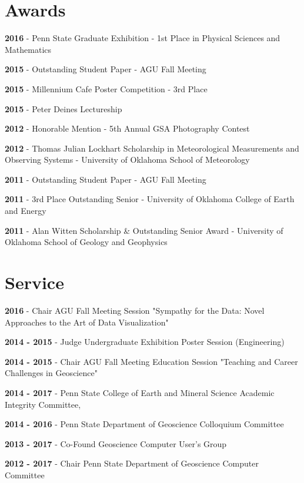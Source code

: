 \documentclass[letterpaper]{article}
\renewenvironment{itemize}{
  \begin{list}{}{
    \setlength{\leftmargin}{1.5em}
  }
}{
  \end{list}
}
\begin{document}
\section*{Awards}
\begin{itemize}
\item \textbf{2016} - Penn State Graduate Exhibition - 1st Place in Physical Sciences and Mathematics
\item \textbf{2015} - Outstanding Student Paper - AGU Fall Meeting
\item \textbf{2015} - Millennium Cafe Poster Competition - 3rd Place
\item \textbf{2015} - Peter Deines Lectureship
\item \textbf{2012} - Honorable Mention - 5th Annual GSA Photography Contest
\item \textbf{2012} - Thomas Julian Lockhart Scholarship in Meteorological Measurements and Observing Systems - University of Oklahoma School of Meteorology
\item \textbf{2011} - Outstanding Student Paper - AGU Fall Meeting
\item \textbf{2011} - 3rd Place Outstanding Senior - University of Oklahoma College of Earth and Energy
\item \textbf{2011} -  Alan Witten Scholarship \& Outstanding Senior Award - University of Oklahoma School of Geology and Geophysics
\end{itemize}

\section*{Service}
\begin{itemize}
\item \textbf{2016} - Chair AGU Fall Meeting Session "Sympathy for the Data: Novel Approaches to the Art of Data Visualization"
\item \textbf{2014 - 2015} - Judge Undergraduate Exhibition Poster Session (Engineering)
\item \textbf{2014 - 2015} - Chair AGU Fall Meeting  Education Session "Teaching and Career Challenges in Geoscience"
\item \textbf{2014 - 2017} - Penn State College of Earth and Mineral Science Academic Integrity Committee,
\item \textbf{2014 - 2016} - Penn State Department of Geoscience Colloquium Committee
\item \textbf{2013 - 2017} - Co-Found Geoscience Computer User's Group
\item \textbf{2012 - 2017} - Chair Penn State Department of Geoscience Computer Committee
\end{itemize}
\end{document}
